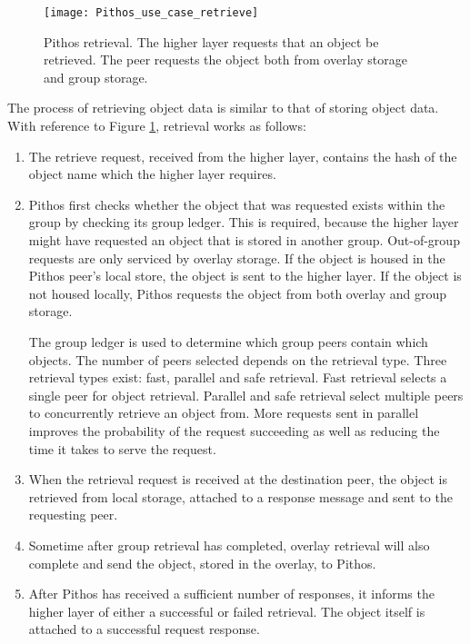 \begin{figure}[htbp]
 \centering
 \texttt{[image: Pithos\_use\_case\_retrieve]}
 \caption{Pithos retrieval. The higher layer requests that an object be retrieved. The peer requests the object both from overlay storage and group storage.}
 \label{fig_pithos_retrieval}
\end{figure}
%
The process of retrieving object data is similar to that of storing object data. With reference to Figure \ref{fig_pithos_retrieval}, retrieval works as follows:
%
\begin{enumerate}
\item The retrieve request, received from the higher layer, contains the hash of the object name which the higher layer requires.

\item Pithos first checks whether the object that was requested exists within the group by checking its group ledger. This is required, because the higher layer might have requested an object that is stored in another group. Out-of-group requests are only serviced by overlay storage. If the object is housed in the Pithos peer's local store, the object is sent to the higher layer. If the object is not housed locally, Pithos requests the object from both overlay and group storage.

    The group ledger is used to determine which group peers contain which objects. The number of peers selected depends on the retrieval type. Three retrieval types exist: fast, parallel and safe retrieval. Fast retrieval selects a single peer for object retrieval. Parallel and safe retrieval select multiple peers to concurrently retrieve an object from. More requests sent in parallel improves the probability of the request succeeding as well as reducing the time it takes to serve the request.

\item When the retrieval request is received at the destination peer, the object is retrieved from local storage, attached to a response message and sent to the requesting peer.

\item Sometime after group retrieval has completed, overlay retrieval will also complete and send the object, stored in the overlay, to Pithos.

\item After Pithos has received a sufficient number of responses, it informs the higher layer of either a successful or failed retrieval. The object itself is attached to a successful request response.
\end{enumerate}

